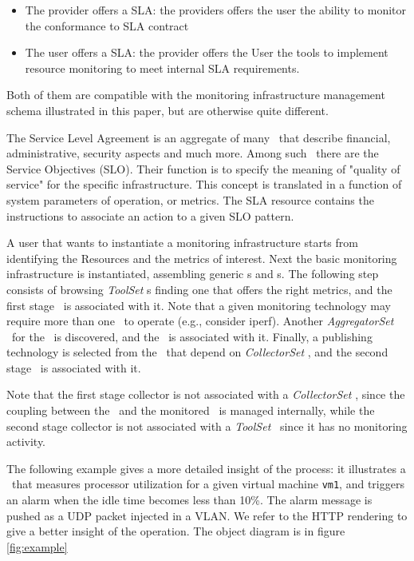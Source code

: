 \documentclass[12pt]{article}  %
\begin{document}
\begin{itemize} 
\item The provider offers a SLA: the providers offers the user the ability to monitor the conformance to SLA contract
\item The user offers a SLA: the provider offers the User the tools to implement resource monitoring to meet internal SLA requirements.
\end{itemize}

Both of them are compatible with the monitoring infrastructure management schema illustrated in this paper, but are otherwise quite different.

The Service Level Agreement is an aggregate of many \rs\, that describe financial, administrative, security aspects and much more. Among such \rs\, there are the Service  Objectives (SLO). Their function is to specify the meaning of "quality of service" for the specific infrastructure. This concept is translated in a function of system parameters of operation, or metrics.
 The SLA resource contains the instructions to associate an action to a given SLO pattern.

A user that wants to instantiate a monitoring infrastructure starts from identifying the Resources and the metrics of interest. Next the basic monitoring infrastructure is instantiated, assembling generic \sens s and \coll s. The following step consists of browsing {\em ToolSet} \mi s finding one that offers the right metrics, and the first stage \coll\ is associated with it. Note that a given monitoring technology may require more than one \coll\ to operate (e.g., consider iperf). Another {\em AggregatorSet} \mi\ for the \sens\ is discovered, and the \sens\ is associated with it. Finally, a publishing technology is selected from the \mi\ that depend on {\em CollectorSet} \mi , and the second stage \coll\ is associated with it.

Note that the first stage collector is not associated with a {\em CollectorSet} \mi, since the coupling between the \sens\ and the monitored \rs\ is managed internally, while the second stage collector is not associated with a {\em ToolSet} \mi\ since it has no monitoring activity. 

The following example gives a more detailed insight of the process: it illustrates a \sens\ that measures processor utilization for a given virtual machine {\tt vm1}, and triggers an alarm when the idle time becomes less than 10\%. The alarm message is pushed as a UDP packet injected in a VLAN. We refer to the HTTP rendering to give a better insight of the operation. The object diagram is in figure \ref  {fig:example}
\end{document}
